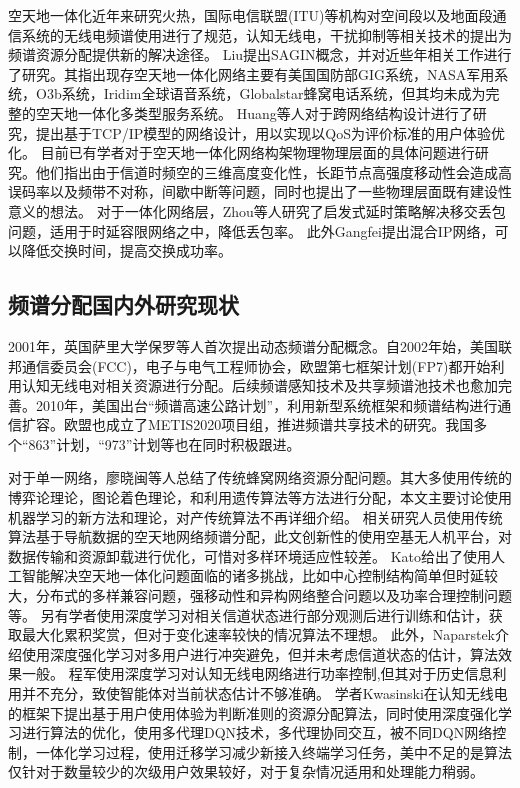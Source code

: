 空天地一体化近年来研究火热，国际电信联盟(ITU)等机构对空间段以及地面段通信系统的无线电频谱使用进行了规范，认知无线电，干扰抑制等相关技术的提出为频谱资源分配提供新的解决途径。
Liu提出SAGIN概念，并对近些年相关工作进行了研究\cite{8368236}。其指出现存空天地一体化网络主要有美国国防部GIG系统，NASA军用系统，O3b系统，Iridim全球语音系统，Globalstar蜂窝电话系统，但其均未成为完整的空天地一体化多类型服务系统。
Huang等人对于跨网络结构设计进行了研究，提出基于TCP/IP模型的网络设计，用以实现以QoS为评价标准的用户体验优化\cite{6587995}。
目前已有学者对于空天地一体化网络构架物理物理层面的具体问题进行研究\cite{7879675}。他们指出由于信道时频空的三维高度变化性，长距节点高强度移动性会造成高误码率以及频带不对称，间歇中断等问题，同时也提出了一些物理层面既有建设性意义的想法。
对于一体化网络层，Zhou等人研究了启发式延时策略解决移交丢包问题，适用于时延容限网络之中，降低丢包率\cite{8116396}。
此外Gangfei提出混合IP网络，可以降低交换时间，提高交换成功率\cite{7925019}。


\subsection{频谱分配国内外研究现状}

2001年，英国萨里大学保罗等人首次提出动态频谱分配概念。自2002年始，美国联邦通信委员会(FCC)，电子与电气工程师协会，欧盟第七框架计划(FP7)都开始利用认知无线电对相关资源进行分配。后续频谱感知技术及共享频谱池技术也愈加完善。2010年，美国出台“频谱高速公路计划”，利用新型系统框架和频谱结构进行通信扩容。欧盟也成立了METIS2020项目组，推进频谱共享技术的研究。我国多个“863”计划，“973”计划等也在同时积极跟进。

对于单一网络，廖晓闽等人总结了传统蜂窝网络资源分配问题\cite{廖晓闽2019基于深度强化学习的蜂窝网资源分配算法}。其大多使用传统的博弈论理论\cite{6998030}，图论着色理论\cite{7833211}，和利用遗传算法\cite{8336853}等方法进行分配，本文主要讨论使用机器学习的新方法和理论，对产传统算法不再详细介绍。
相关研究人员使用传统算法基于导航数据的空天地网络频谱分配，此文创新性的使用空基无人机平台，对数据传输和资源卸载进行优化，可惜对多样环境适应性较差\cite{7127619}。
Kato给出了使用人工智能解决空天地一体化问题面临的诸多挑战，比如中心控制结构简单但时延较大，分布式的多样兼容问题，强移动性和异构网络整合问题以及功率合理控制问题等\cite{8612450}。
另有学者使用深度学习对相关信道状态进行部分观测后进行训练和估计，获取最大化累积奖赏，但对于变化速率较快的情况算法不理想\cite{8303773}。
此外，Naparstek介绍使用深度强化学习对多用户进行冲突避免，但并未考虑信道状态的估计，算法效果一般\cite{8254101}。
程军使用深度学习对认知无线电网络进行功率控制,但其对于历史信息利用并不充分，致使智能体对当前状态估计不够准确\cite{Li2018Intelligent}。
学者Kwasinski在认知无线电的框架下提出基于用户使用体验为判断准则的资源分配算法，同时使用深度强化学习进行算法的优化，使用多代理DQN技术，多代理协同交互，被不同DQN网络控制，一体化学习过程，使用迁移学习减少新接入终端学习任务，美中不足的是算法仅针对于数量较少的次级用户效果较好，对于复杂情况适用和处理能力稍弱\cite{8403658}。

